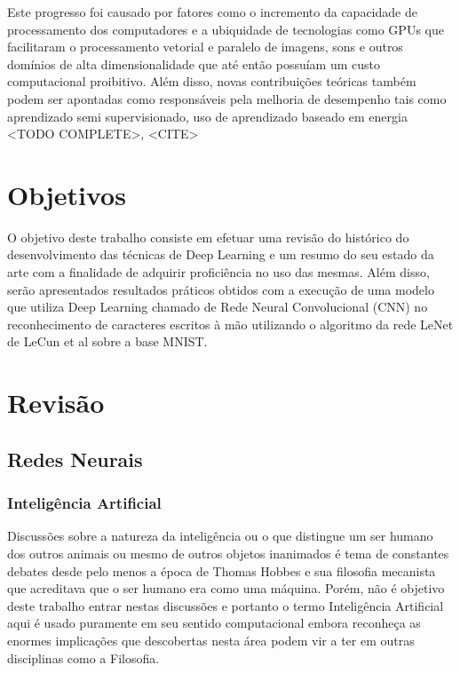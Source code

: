 \documentclass[cic,tc]{iiufrgs}
\begin{document}
Este progresso foi causado por fatores como o incremento da capacidade de
processamento dos computadores e a ubiquidade de tecnologias como GPUs que
facilitaram o processamento vetorial e paralelo de imagens, sons e outros
domínios de alta dimensionalidade que até então possuíam um custo computacional
proibitivo. Além disso, novas contribuições teóricas também podem ser apontadas
como responsáveis pela melhoria de desempenho tais como aprendizado semi
supervisionado, uso de aprendizado baseado em energia <TODO COMPLETE>, <CITE>

\section{Objetivos}

O objetivo deste trabalho consiste em efetuar uma revisão do
histórico do desenvolvimento das técnicas de Deep Learning e um resumo do seu
estado da arte com a finalidade de adquirir proficiência no uso das mesmas.
Além disso, serão apresentados resultados práticos obtidos com a execução de
uma modelo que utiliza Deep Learning chamado de Rede Neural Convolucional
(CNN) no reconhecimento de caracteres escritos à mão utilizando o algoritmo da
rede LeNet de LeCun et al sobre a base MNIST.\@

\section{Revisão}

\subsection{Redes Neurais}

\subsubsection{Inteligência Artificial}

Discussões sobre a natureza da inteligência ou o que distingue um ser humano
dos outros animais ou mesmo de outros objetos inanimados é tema de constantes
debates desde pelo menos a época de Thomas Hobbes e sua filosofia mecanista que
acreditava que o ser humano era como uma máquina. Porém, não é objetivo deste
trabalho entrar nestas discussões e portanto o termo Inteligência Artificial
aqui é usado puramente em seu sentido computacional embora reconheça as enormes
implicações que descobertas nesta área podem vir a ter em outras disciplinas
como a Filosofia.
\end{document}
